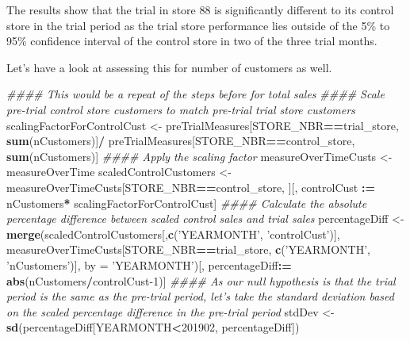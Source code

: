 \documentclass[]{article}
\newenvironment{Shaded}{\begin{snugshade}}{\end{snugshade}}
\newcommand{\CommentTok}[1]{\textcolor[rgb]{0.56,0.35,0.01}{\textit{#1}}}
\newcommand{\DataTypeTok}[1]{\textcolor[rgb]{0.13,0.29,0.53}{#1}}
\newcommand{\DecValTok}[1]{\textcolor[rgb]{0.00,0.00,0.81}{#1}}
\newcommand{\ErrorTok}[1]{\textcolor[rgb]{0.64,0.00,0.00}{\textbf{#1}}}
\newcommand{\KeywordTok}[1]{\textcolor[rgb]{0.13,0.29,0.53}{\textbf{#1}}}
\newcommand{\NormalTok}[1]{#1}
\newcommand{\OperatorTok}[1]{\textcolor[rgb]{0.81,0.36,0.00}{\textbf{#1}}}
\newcommand{\StringTok}[1]{\textcolor[rgb]{0.31,0.60,0.02}{#1}}
\begin{document}
The results show that the trial in store 88 is significantly different
to its control store in the trial period as the trial store performance
lies outside of the 5\% to 95\% confidence interval of the control store
in two of the three trial months.

Let's have a look at assessing this for number of customers as well.

\begin{Shaded}
\begin{Highlighting}[]
\CommentTok{#### This would be a repeat of the steps before for total sales}
\CommentTok{#### Scale pre-trial control store customers to match pre-trial trial store customers}
\NormalTok{scalingFactorForControlCust <-}\StringTok{ }\NormalTok{preTrialMeasures[STORE_NBR}\OperatorTok{==}\NormalTok{trial_store, }\KeywordTok{sum}\NormalTok{(nCustomers)]}\OperatorTok{/}
\StringTok{                               }\NormalTok{preTrialMeasures[STORE_NBR}\OperatorTok{==}\NormalTok{control_store, }\KeywordTok{sum}\NormalTok{(nCustomers)]}
\CommentTok{#### Apply the scaling factor}
\NormalTok{measureOverTimeCusts <-}\StringTok{ }\NormalTok{measureOverTime}
\NormalTok{scaledControlCustomers <-}\StringTok{ }\NormalTok{measureOverTimeCusts[STORE_NBR}\OperatorTok{==}\NormalTok{control_store,}
\NormalTok{                                               ][, controlCust }\OperatorTok{:}\ErrorTok{=}\StringTok{ }\NormalTok{nCustomers}\OperatorTok{*}
\StringTok{                                                   }\NormalTok{scalingFactorForControlCust]}
\CommentTok{#### Calculate the absolute percentage difference between scaled control sales and trial sales}
\NormalTok{percentageDiff <-}\StringTok{ }\KeywordTok{merge}\NormalTok{(scaledControlCustomers[,}\KeywordTok{c}\NormalTok{(}\StringTok{'YEARMONTH'}\NormalTok{, }\StringTok{'controlCust'}\NormalTok{)], }
\NormalTok{                        measureOverTimeCusts[STORE_NBR}\OperatorTok{==}\NormalTok{trial_store,}
                                             \KeywordTok{c}\NormalTok{(}\StringTok{'YEARMONTH'}\NormalTok{, }\StringTok{'nCustomers'}\NormalTok{)],}
                        \DataTypeTok{by =} \StringTok{'YEARMONTH'}\NormalTok{)[, percentageDiff}\OperatorTok{:}\ErrorTok{=}\StringTok{ }\KeywordTok{abs}\NormalTok{(nCustomers}\OperatorTok{/}\NormalTok{controlCust}\DecValTok{-1}\NormalTok{)]}
\CommentTok{#### As our null hypothesis is that the trial period is the same as the pre-trial period, let's take the standard deviation based on the scaled percentage difference in the pre-trial period}
\NormalTok{stdDev <-}\StringTok{ }\KeywordTok{sd}\NormalTok{(percentageDiff[YEARMONTH}\OperatorTok{<}\DecValTok{201902}\NormalTok{, percentageDiff])}

\end{Highlighting}
\end{Shaded}
\end{document}
